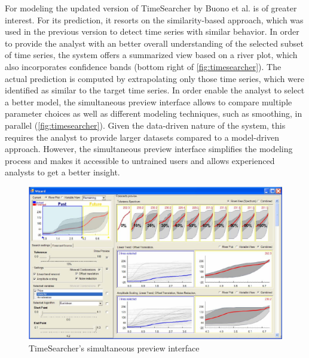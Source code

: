 \documentclass[electronic]{vgtc}             %
\begin{document}
For modeling the updated version of TimeSearcher by Buono et al. \cite{buono:2007} is of greater interest.  
For its prediction, it resorts on the similarity-based approach, which was used in the previous version \cite{buono:2005} to detect time series with similar behavior.
In order to provide the analyst with an better overall understanding of the selected subset of time series, the system offers a summarized view based on a river plot, which also incorporates confidence bands (bottom right of \autoref{fig:timesearcher}).
The actual prediction is computed by extrapolating only those time series, which were identified as similar to the target time series.
In order enable the analyst to select a better model, the simultaneous preview interface allows to compare multiple parameter choices as well as different modeling techniques, such as smoothing, in parallel (\autoref{fig:timesearcher}). 
Given the data-driven nature of the system, this requires the analyst to provide larger datasets compared to a model-driven approach.
However, the simultaneous preview interface simplifies the modeling process and makes it accessible to untrained users and allows experienced analysts to get a better insight.

\begin{figure}[htb]
	\centering
	\includegraphics[width=\columnwidth]{TimeSearcher}
	\caption{TimeSearcher's \cite{buono:2007} simultaneous preview interface
	}
	\label{fig:timesearcher}
\end{figure}
\end{document}
